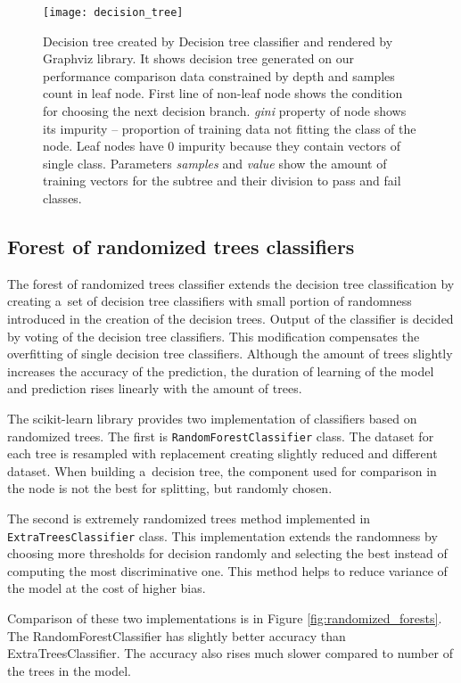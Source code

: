 \begin{figure}
  \centering
  \texttt{[image: decision\_tree]}
  \caption{Decision tree created by Decision tree classifier and rendered by
    Graphviz library. It shows decision tree generated on our
    performance comparison data constrained by depth and samples count in leaf
    node. First line of non-leaf node shows the condition for choosing the next
    decision branch. \emph{gini} property of node shows its impurity --
    proportion of training data not fitting the class of the node. Leaf nodes
    have 0 impurity because they contain vectors of single class. Parameters
    \emph{samples} and \emph{value} show the amount of training vectors for the
    subtree and their division to pass and fail classes.}
  \label{fig:decision_tree}
\end{figure}

\subsection{Forest of randomized trees classifiers}
The forest of randomized trees classifier extends the decision tree
classification by creating a~set of decision tree classifiers with small portion
of randomness introduced in the creation of the decision trees. Output of the
classifier is decided by voting of the decision tree classifiers. This
modification compensates the overfitting of single decision tree classifiers.
Although the amount of trees slightly increases the accuracy of the prediction,
the duration of learning of the model and prediction rises linearly with the
amount of trees.

The scikit-learn library provides two implementation of classifiers based on
randomized trees. The first is \texttt{Random\-Forest\-Classifier} class. The
dataset for each tree is resampled with replacement creating slightly reduced
and different dataset. When building a~decision tree, the component used for
comparison in the node is not the best for splitting, but randomly chosen.

The second is extremely randomized trees method implemented in
\texttt{Extra\-Trees\-Classifier} class. This implementation extends the randomness
by choosing more thresholds for decision randomly and selecting the best instead
of computing the most discriminative one. This method helps to reduce variance
of the model at the cost of higher bias.

Comparison of these two implementations is in Figure
\ref{fig:randomized_forests}. The RandomForestClassifier has slightly better
accuracy than ExtraTreesClassifier. The accuracy also rises much slower compared to
number of the trees in the model.

